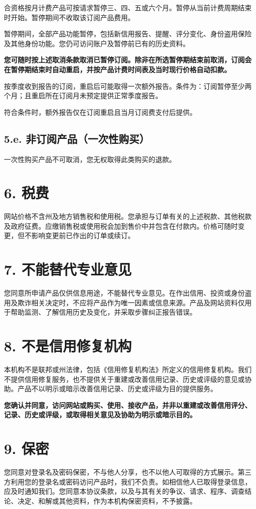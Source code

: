 \documentclass[UTF8,fontset=none,11pt,a4paper]{ctexart}
\begin{document}
合资格按月计费产品可按请求暂停三、四、五或六个月。暂停从当前计费周期结束时开始。暂停期间不收取该订阅产品费用。


暂停期间，全部产品功能暂停，包括新信用报告、提醒、评分变化、身份盗用保险及其他身份功能。您仍可访问账户及暂停前已有的历史资料。


\textbf{您可随时按上述取消条款取消已暂停订阅。除非在所选暂停期结束前取消，订阅会在暂停期结束时自动重启，并按产品计费时间表及当时现行价格自动扣款。}


按季度收到报告的订阅，重启后可能取得一次额外报告。条件为：订阅暂停至少两个月；且重启所在订阅月未预定提供正常季度报告。


符合条件时，额外报告仅在订阅重启且当月订阅费支付后提供。


\subsection*{5.e. 非订阅产品（一次性购买）}
一次性购买产品不可取消，您无权取得此类购买的退款。


\section*{6. 税费}
网站价格不含州及地方销售税和使用税。您承担与订单有关的上述税款、其他税款及政府征费。应缴销售税或使用税会加到售价中并包含在付款内。价格可随时变更，但不影响变更前已作出的订单或续订。


\section*{7. 不能替代专业意见}
您同意所申请产品仅供信息用途，不能替代专业意见。在作出信用、投资或身份盗用及欺诈相关决定时，不应将产品作为唯一因素或信息来源。产品及网站资料仅用于帮助监测、了解信用历史及变化，并采取步骤纠正报告错误。


\section*{8. 不是信用修复机构}
本机构不是联邦或州法律，包括《信用修复机构法》所定义的信用修复机构。我们不提供信用修复服务，也不提供关于重建或改善信用记录、历史或评级的意见或协助。产品不以明示或暗示改善信用记录、历史或评级为目的提供服务。


\textbf{您确认并同意，访问网站或购买、使用、接收产品，并非以重建或改善信用评分、记录、历史或评级，或取得相关意见及协助为明示或暗示目的。}


\section*{9. 保密}
您同意对登录名及密码保密，不与他人分享，也不以他人可取得的方式展示。第三方利用您的登录名或密码访问产品时，我们不负责。如相信他人已取得登录信息，应及时通知我们。您同意本协议条款，以及与其有关的争议、请求、程序、调查结论、决定、和解或其他资料，作为本机构保密资料，不予披露。
\end{document}

